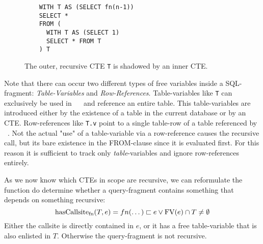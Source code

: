 \begin{wrapfigure}{r}{0.4\textwidth}
    \begin{verbatim}
    WITH T AS (SELECT fn(n-1))
    SELECT *
    FROM (
      WITH T AS (SELECT 1)
      SELECT * FROM T
    ) T
    \end{verbatim}
    \caption{The outer, recursive CTE \texttt{T} is shadowed by an inner CTE.}
    \label{lst:indirect_callsite_ref}
\end{wrapfigure}

Note that there can occur two different types of free variables inside a SQL-fragment: \textit{Table-Variables} and \textit{Row-References}. Table-variables like \texttt{T} can exclusively be used in ~\FROM~ and reference an entire table. This table-variables are introduced either by the existence of a table in the current database or by an CTE. Row-references like \texttt{T.v} point to a single table-row of a table referenced by ~\FROM. Not the actual "use" of a table-variable via a row-reference causes the recursive call, but its bare existence in the FROM-clause since it is evaluated first. For this reason it is sufficient to track only \textit{table}-variables and ignore row-references entirely.

As we now know which CTEs in scope are recursive, we can reformulate the function do determine whether a query-fragment contains something that depends on something recursive:
$$\operatorname{\text{hasCallsite}_{fn}}(T, e) = fn(\dots) \sqsubset e \lor \operatorname{\text{\rm FV}}(e) \cap T \neq \emptyset$$
Either the callsite is directly contained in $e$, or it has a free table-variable that is also enlisted in $T$. Otherwise the query-fragment is not recursive.



